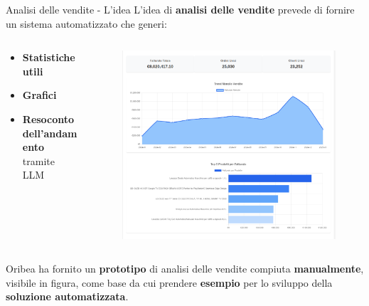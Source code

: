 \documentclass{beamer}
\begin{document}
	\begin{frame}{Analisi delle vendite - L'idea}
		L'idea di \textbf{analisi delle vendite} prevede di fornire un sistema automatizzato che generi:

		\begin{columns}
			\begin{column}{0.6\textwidth}
				\begin{itemize}
					\item \textbf{Statistiche utili}
					\item \textbf{Grafici}
					\item \textbf{Resoconto dell'andamento} tramite LLM
				\end{itemize}
			\end{column}
			\begin{column}{0.4\textwidth}
				\begin{figure}
					\centering
					\includegraphics[width=\textwidth]{Oribea - Esempio di report delle vendite.png}
				\end{figure}
			\end{column}
		\end{columns}

		\vspace{0.5em}
		Oribea ha fornito un \textbf{prototipo} di analisi delle vendite compiuta \textbf{manualmente}, visibile in figura, come base da cui prendere \textbf{esempio} per lo sviluppo della \textbf{soluzione automatizzata}.
	\end{frame}
\end{document}
